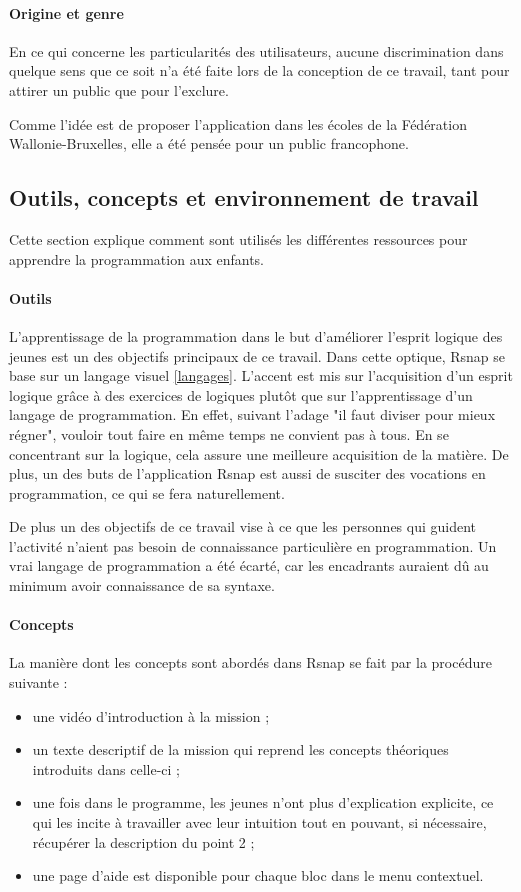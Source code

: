 \paragraph{Origine et genre}
En ce qui concerne les particularités des utilisateurs, aucune discrimination dans quelque sens que ce soit n'a été faite lors de la conception de ce travail, tant pour attirer un public que pour l'exclure. 

Comme l'idée est de proposer l'application dans les écoles de la Fédération Wallonie-Bruxelles, elle a été pensée pour un public francophone. 

\subsection{Outils, concepts et environnement de travail}
Cette section explique comment sont utilisés les différentes ressources pour apprendre la programmation aux enfants.

\paragraph{Outils}
\label{outil}
L'apprentissage de la programmation dans le but d'améliorer l'esprit logique des jeunes est un des objectifs principaux de ce travail. Dans cette optique, Rsnap se base sur un langage visuel \ref{langages}. L'accent est mis sur l'acquisition d'un esprit logique grâce à des exercices de logiques plutôt que sur l'apprentissage d'un langage de programmation.  En effet, suivant l'adage "il faut diviser pour mieux régner", vouloir tout faire en même temps ne convient pas à tous. En se concentrant sur la logique, cela assure une meilleure acquisition de la matière. De plus, un des buts de l'application Rsnap est aussi de susciter des vocations en programmation, ce qui se fera naturellement.

De plus un des objectifs de ce travail vise à ce que les personnes qui guident l'activité n'aient pas besoin de connaissance particulière en programmation. Un vrai langage de programmation a été écarté, car les encadrants auraient dû au minimum avoir connaissance de sa syntaxe.

\paragraph{Concepts}
La manière dont les concepts sont abordés dans Rsnap se fait par la procédure suivante :
\begin{itemize}
	\item une vidéo d'introduction à la mission ;
	\item un texte descriptif de la mission qui reprend les concepts théoriques introduits dans celle-ci ;
	\item une fois dans le programme, les jeunes n'ont plus d'explication explicite, ce qui les incite à travailler avec leur intuition tout en pouvant, si nécessaire, récupérer la description du point 2 ;
	\item une page d'aide est disponible pour chaque bloc dans le menu contextuel.
\end{itemize}

